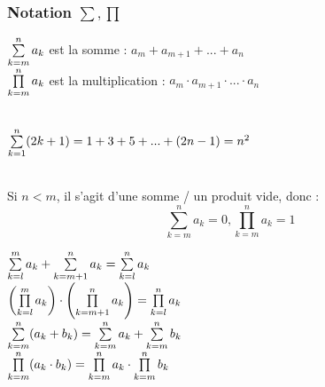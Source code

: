 \documentclass[12pt,a4paper]{article}
\begin{document}
\subsubsection{Notation $\sum, \prod$}
\begin{boite}
	$\somme{n}{k=m}a_k$ est la somme : $a_m + a_{m+1} +...+a_n$\\
	$\produit{n}{k=m}a_k$ est la multiplication : $a_m \cdot a_{m+1} \cdot... \cdot a_n$\\
\end{boite}
\\
$\somme{n}{k=1}(2k+1) = 1 + 3 + 5 +... + (2n-1) = n^2$
\begin{boite}
	\Definition \\
	Si $n < m$, il s'agit d'une somme / un produit vide, donc :
	\begin{equation}
		\sum^{n}_{k=m}a_k = 0, \prod^{n}_{k=m}a_k = 1
	\end{equation}
\end{boite}

\begin{center}
	$\somme{m}{k=l}a_k + \somme{n}{k=m+1}a_k = \somme{n}{k=l}a_k$\\	
	$\left(\produit{m}{k=l}a_k\right)\cdot\left(\produit{n}{k=m+1}a_k\right) = \produit{n}{k=l}a_k$\\
	$\somme{n}{k=m}(a_k + b_k) = \somme{n}{k=m}a_k + \somme{n}{k=m}b_k$\\
	$\produit{n}{k=m}(a_k\cdot b_k) = \produit{n}{k=m}a_k \cdot \produit{n}{k=m}b_k$
\end{center}
\end{document}
